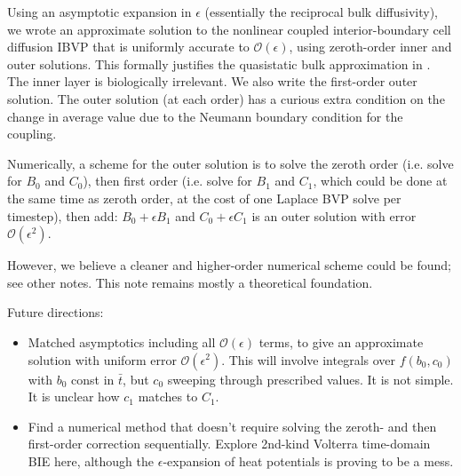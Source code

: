 \documentclass[10pt]{article}
\newcommand{\bi}{\begin{itemize}}
\newcommand{\ei}{\end{itemize}}
\newcommand{\bigO}{{\mathcal O}}
\newcommand{\eps}{\epsilon}
\begin{document}
Using an asymptotic expansion in $\eps$ (essentially the reciprocal bulk diffusivity),
we wrote an approximate solution to the nonlinear coupled
interior-boundary cell diffusion IBVP that is uniformly accurate
to $\bigO(\eps)$, using zeroth-order inner and outer solutions.
This formally justifies the quasistatic bulk
approximation in \cite{diegmiller18}.
The inner layer is biologically irrelevant.
We also write the first-order outer solution.
The outer solution (at each order) has a curious extra condition on the change in average value due to the Neumann boundary condition for the coupling.

Numerically, a scheme for the outer solution
is to solve the zeroth order (i.e. solve for $B_0$ and $C_0$),
then first order (i.e. solve for $B_1$ and $C_1$, which could be
done at the same time as zeroth order, at the cost of one Laplace BVP
solve per timestep),
then add: $B_0+\eps B_1$ and $C_0 + \eps C_1$ is an outer solution
with error $\bigO(\eps^2)$.

However, we believe a cleaner and higher-order numerical scheme could be found;
see other notes.
This note remains mostly a theoretical foundation.

Future directions:
\bi
\item Matched asymptotics including all $\bigO(\eps)$ terms,
  to give an approximate solution with uniform error $\bigO(\eps^2)$.
  This will involve integrals over $f(b_0,c_0)$ with $b_0$ const in $\bar{t}$,
  but $c_0$ sweeping through prescribed values.
  It is not simple.
  It is unclear how $c_1$ matches to $C_1$.
\item Find a numerical method that doesn't require solving the
  zeroth- and then first-order correction sequentially.
  Explore 2nd-kind Volterra time-domain BIE here, although the
  $\eps$-expansion of heat potentials is proving to be a mess.
\ei

  




\end{document}
